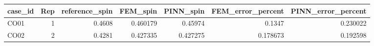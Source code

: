 \begin{tabular}{lrrrrrr}
\toprule
case\_id & Rep & reference\_spin & FEM\_spin & PINN\_spin & FEM\_error\_percent & PINN\_error\_percent \\
\midrule
CO01 & 1 & 0.4608 & 0.460179 & 0.45974 & 0.1347 & 0.230022 \\
CO02 & 2 & 0.4281 & 0.427335 & 0.427275 & 0.178673 & 0.192598 \\
\bottomrule
\end{tabular}
